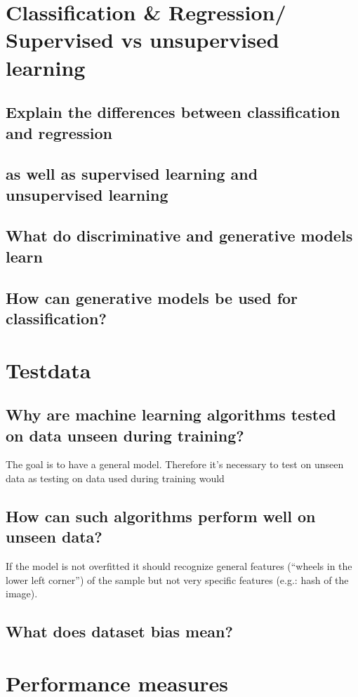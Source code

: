 

\section{Classification \& Regression/ Supervised vs unsupervised learning}
\subsection{Explain the differences between classification and regression }
\subsection{as well as supervised learning and unsupervised learning }
\subsection{What do discriminative and generative models learn }
\subsection{How can generative models be used for classification?}

\section{Testdata}
\subsection{Why are machine learning algorithms tested on data unseen during training?}
The goal is to have a general model. Therefore it's necessary to test on unseen data as testing on data used during training would 
\subsection{How can such algorithms perform well on unseen data?}
If the model is not overfitted it should recognize general features (``wheels in the lower left corner'') of the sample but not very specific features (e.g.: hash of the image). 
\subsection{What does dataset bias mean? }

\section{Performance measures}
